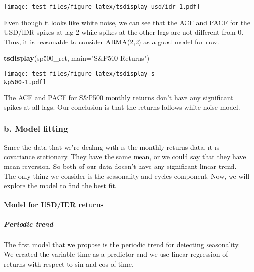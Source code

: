 \documentclass[]{article}
\newenvironment{Shaded}{\begin{snugshade}}{\end{snugshade}}
\newcommand{\KeywordTok}[1]{\textcolor[rgb]{0.13,0.29,0.53}{\textbf{#1}}}
\newcommand{\DataTypeTok}[1]{\textcolor[rgb]{0.13,0.29,0.53}{#1}}
\newcommand{\StringTok}[1]{\textcolor[rgb]{0.31,0.60,0.02}{#1}}
\newcommand{\NormalTok}[1]{#1}
\let\oldparagraph\paragraph
\renewcommand{\paragraph}[1]{\oldparagraph{#1}\mbox{}}
\let\oldsubparagraph\subparagraph
\renewcommand{\subparagraph}[1]{\oldsubparagraph{#1}\mbox{}}
\begin{document}
\texttt{[image: test\_files/figure-latex/tsdisplay usd/idr-1.pdf]}

Even though it looks like white noise, we can see that the ACF and PACF
for the USD/IDR spikes at lag 2 while spikes at the other lags are not
different from 0. Thus, it is reasonable to consider ARMA(2,2) as a good
model for now.

\begin{Shaded}
\begin{Highlighting}[]
\KeywordTok{tsdisplay}\NormalTok{(sp500_ret, }\DataTypeTok{main=}\StringTok{"S&P500 Returns"}\NormalTok{)}
\end{Highlighting}
\end{Shaded}

\texttt{[image: test\_files/figure-latex/tsdisplay s\\\&p500-1.pdf]}

The ACF and PACF for S\&P500 monthly returns don't have any significant
spikes at all lags. Our conclusion is that the returns follows white
noise model.

\subsubsection{b. Model fitting}\label{b.-model-fitting}

Since the data that we're dealing with is the monthly returns data, it
is covariance stationary. They have the same mean, or we could say that
they have mean reversion. So both of our data doesn't have any
significant linear trend. The only thing we consider is the seasonality
and cycles component. Now, we will explore the model to find the best
fit.

\paragraph{Model for USD/IDR returns}\label{model-for-usdidr-returns}

\subparagraph{Periodic trend}\label{periodic-trend}

The first model that we propose is the periodic trend for detecting
seasonality. We created the variable time as a predictor and we use
linear regression of returns with respect to sin and cos of time.
\end{document}
